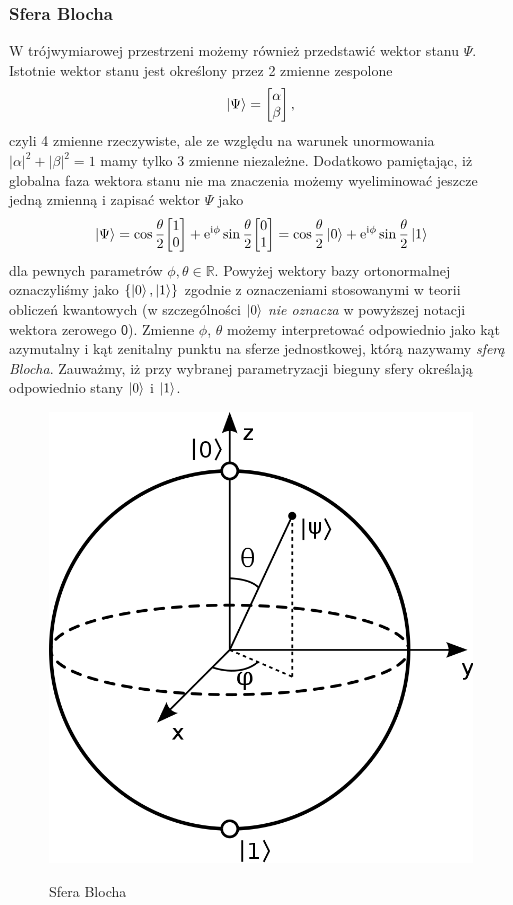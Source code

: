 \documentclass{myclass}
\begin{document}
\subsubsection{Sfera Blocha}

W trójwymiarowej przestrzeni możemy również przedstawić wektor stanu \(\Psi\). Istotnie wektor stanu
jest określony przez 2 zmienne zespolone
\begin{equation*}
    \ket{\Psi} = \mqty[\alpha \\ \beta]\,,
\end{equation*}
czyli 4 zmienne rzeczywiste, ale ze względu na warunek unormowania \(|\alpha|^2 + |\beta|^2 = 1\)
mamy tylko 3 zmienne niezależne. Dodatkowo pamiętając, iż globalna faza wektora stanu nie ma
znaczenia możemy wyeliminować jeszcze jedną zmienną i zapisać wektor \(\Psi\) jako
\begin{equation*}
    \ket{\Psi} = \cos\frac{\theta}{2}\mqty[1 \\ 0] + \e^{\im\phi}\sin\frac{\theta}{2}\mqty[0\\1] = \cos\frac{\theta}{2}\ket{0} + \e^{\im\phi}\sin\frac{\theta}{2}\ket{1}
\end{equation*}
dla pewnych parametrów \(\phi,\theta\in\mathbb{R}\). Powyżej wektory bazy ortonormalnej oznaczyliśmy
jako \(\{\ket{0}, \ket{1}\}\) zgodnie z oznaczeniami stosowanymi w teorii obliczeń kwantowych (w
szczególności \(\ket{0}\) \textit{nie oznacza} w powyższej notacji wektora zerowego \(\mathsf{0}\)).
Zmienne \(\phi\), \(\theta\) możemy interpretować odpowiednio jako kąt azymutalny i kąt zenitalny
punktu na sferze jednostkowej, którą nazywamy \textit{sferą Blocha}. Zauważmy, iż przy wybranej
parametryzacji bieguny sfery określają odpowiednio stany \(\ket{0}\) i \(\ket{1}\).

\begin{figure}[ht]
    \centering
    \includegraphics[width=0.45\columnwidth]{figs/Bloch_sphere.png}
    \label{fig:bloch_sphere}
    \caption{Sfera Blocha}
\end{figure}
\end{document}
